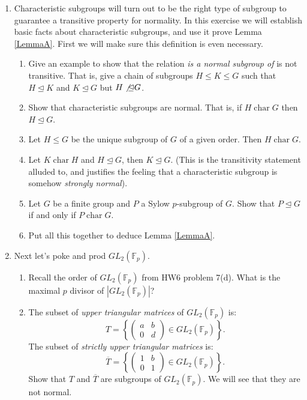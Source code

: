 \documentclass[11pt]{article}
\newcommand{\ch}{\operatorname{char}}
\newcommand{\bF}{\mathbb{F}}
\begin{document}
\begin{enumerate}
  \item{
  Characteristic subgroups will turn out to be the right type of subgroup to guarantee a transitive property for normality.  In this exercise we will establish basic facts about characteristic subgroups, and use it prove Lemma \ref{LemmaA}.  First we will make sure this definition is even necessary.
  \begin{enumerate}
    \item{
    Give an example to show that the relation \textit{is a normal subgroup of} is not transitive.  That is, give a chain of subgroups $H\le K\le G$ such that $H\unlhd K$ and $K\unlhd G$ but $H\not\unlhd G$.
    }
    \item{
    Show that characteristic subgroups are normal.  That is, if $H\ch G$ then $H\unlhd G$.
    }
    \item{
    Let $H\le G$ be the unique subgroup of $G$ of a given order.  Then $H\ch G$.
    }
    \item{
    Let $K\ch H$ and $H\unlhd G$, then $K\unlhd G$.  (This is the transitivity statement alluded to, and justifies the feeling that a characteristic subgroup is somehow \textit{strongly normal}).
    }
    \item{
    Let $G$ be a finite group and $P$ a Sylow $p$-subgroup of $G$.  Show that $P\unlhd G$ if and only if $P\ch G$.
    }
    \item{
    Put all this together to deduce Lemma \ref{LemmaA}.
    }
  \end{enumerate}
  }
  \item Next let's poke and prod $GL_2(\bF_p)$.
  \begin{enumerate}
    \item{
    Recall the order of $GL_2(\bF_p)$ from HW6 problem 7(d).  What is the maximal $p$ divisor of $|GL_2(\bF_p)|$?
    }
    \item{
    The subset of \textit{upper triangular matrices} of $GL_2(\bF_p)$ is:
    \[T = \left\{\begin{pmatrix}a & b\\0 & d\end{pmatrix}\in GL_2(\bF_p)\right\}.\]
    The subset of \textit{strictly upper triangular matrices} is:
    \[\overline T = \left\{\begin{pmatrix}1 & b\\0 & 1\end{pmatrix}\in GL_2(\bF_p)\right\}.\]
    Show that $T$ and $\overline T$ are subgroups of $GL_2(\bF_p)$.  We will see that they are not normal.
}
\end{enumerate}
\end{enumerate}
\end{document}
